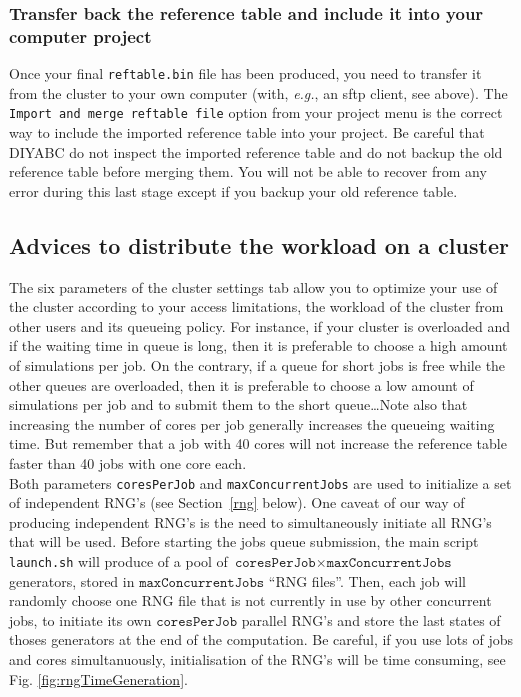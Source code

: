 \subsubsection{Transfer back the reference table and include it into your computer project}\label{clusterback}
Once your final \texttt{reftable.bin} file has been produced, you need to transfer it from the cluster to  your own computer (with, \textit{e.g.}, an sftp client, see above). The  \texttt{Import and merge reftable file} option from your project menu is the correct way to include the imported reference table into your project. Be careful that DIYABC do not inspect the imported reference table and do not backup the old reference table before merging them. You will not be able to recover from any error during this last stage except if you backup your old reference table. 

\subsection{Advices to distribute the workload on a cluster}\label{sub:advices}

The six parameters of the cluster settings tab allow you to optimize your use of the cluster according to your access limitations, the workload of the cluster from other users and its queueing policy. 
For instance, if your cluster is overloaded and if the waiting time in queue is long, then it is preferable to choose a high amount of simulations per job. On the contrary, if a queue for short jobs is free while the other queues are overloaded, then it is preferable to choose a low amount of simulations per job and to submit them to the short queue\ldots Note also that increasing the number of cores per job generally increases the queueing waiting time. But remember that a job with 40 cores will not increase the reference table faster than 40 jobs with one core each. \\

Both parameters \texttt{coresPerJob} and \texttt{maxConcurrentJobs} are used to initialize a set of independent RNG's (see Section~\ref{rng} below). One caveat of our way of producing independent RNG's is the need to simultaneously initiate all RNG's that will be used. Before starting the jobs queue submission, the main script \texttt{launch.sh} will produce of a pool of  $\texttt{coresPerJob}\times\texttt{maxConcurrentJobs}$ generators, stored in $\texttt{maxConcurrentJobs}$ ``RNG files''. Then, each job will randomly choose one RNG file that is not currently in use by other concurrent jobs, to initiate its own $\texttt{coresPerJob}$ parallel RNG's and store the last states of thoses generators at the end of the computation. Be careful, if you use lots of jobs and cores simultanuously,  initialisation of the RNG's will be time consuming, see Fig. \ref{fig:rngTimeGeneration}.


